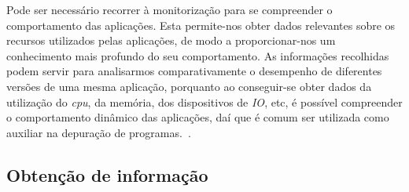 Pode ser necessário recorrer à monitorização para se compreender o comportamento das aplicações.
Esta permite-nos obter dados relevantes sobre os recursos utilizados pelas aplicações, de modo a proporcionar-nos um conhecimento mais profundo do seu comportamento.
As informações recolhidas podem servir para analisarmos comparativamente o desempenho de diferentes versões de uma mesma aplicação, porquanto ao conseguir-se obter dados da utilização do \textit{cpu}, da memória, dos dispositivos de \textit{IO}, etc, é possível compreender o comportamento dinâmico das aplicações, daí que é comum ser utilizada como auxiliar na depuração de programas.~\cite{DuartePhd05}.


\subsection{Obtenção de informação}\label{sect:instrumentation_overview}
% 
% 
% 
% 
% 
% 
% 

